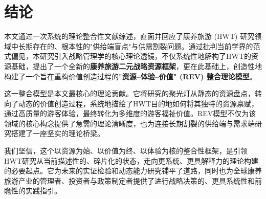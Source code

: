 \documentclass[UTF8, 12pt, a4paper, twoside]{ctexart}
\begin{document}
\section{结论}
本文通过一次系统的理论整合性文献综述，直面并回应了康养旅游 (HWT) 研究领域中长期存在的、根本性的"供给端盲点"与供需割裂问题。通过批判当前学界的范式偏见，本研究引入战略管理学的核心理论透镜，不仅系统性地解构了HWT的资源基础，提出了一个全新的\textbf{康养旅游二元战略资源框架}，更在此基础上，创造性地构建了一个旨在重构价值创造过程的\textbf{"资源--体验--价值" (REV) 整合理论模型}。

这一整合模型是本文最核心的理论贡献。它将研究的聚光灯从静态的资源盘点，转向了动态的价值创造过程，系统地描绘了HWT目的地如何将其独特的资源禀赋，通过高质量的游客体验，最终转化为多维度的游客福祉价值。REV模型不仅为该领域的核心构念提供了急需的理论清晰度，也为连接长期割裂的供给端与需求端研究搭建了一座坚实的理论桥梁。

我们坚信，这个以资源为始、以价值为终、以体验为核的整合性框架，是引领HWT研究从当前描述性的、碎片化的状态，走向更系统、更具解释力的理论构建的必要起点。它为未来的实证检验和动态能力研究铺平了道路，同时也为全球康养旅游产业的管理者、投资者与政策制定者提供了进行战略决策的、更具系统性和前瞻性的实践指引。

\newpage
\printbibliography
\end{document}
